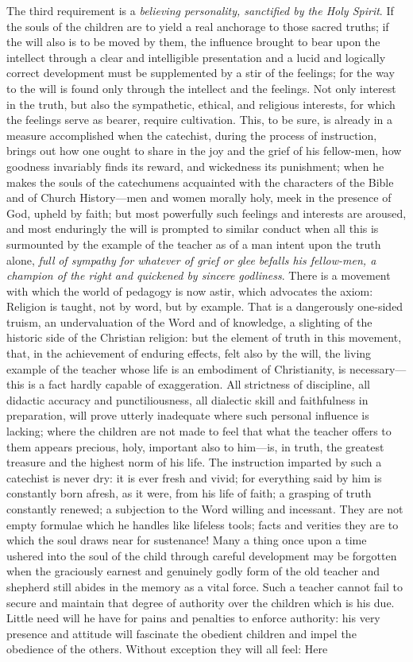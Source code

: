 The third requirement is a \emph{believing personality, sanctified by the Holy Spirit}. If the souls of the children are to yield a real anchorage to those sacred truths; if the will also is to be moved by them, the influence brought to bear upon the intellect through a clear and intelligible presentation and a lucid and logically correct development must be supplemented by a stir of the feelings; for the way to the will is found only through the intellect and the feelings. Not only interest in the truth, but also the sympathetic, ethical, and religious interests, for which the feelings serve as bearer, require cultivation. This, to be sure, is already in a measure accomplished when the catechist, during the process of instruction, brings out how one ought to share in the joy and the grief of his fellow-men, how goodness invariably finds its reward, and wickedness its punishment; when he makes the souls of the catechumens acquainted with the characters of the Bible and of Church History—men and women morally holy, meek in the presence of God, upheld by faith; but most powerfully such feelings and interests are aroused, and most enduringly the will is prompted to similar conduct when all this is surmounted by the example of the teacher as of a man intent upon the truth alone, \emph{full}
\emph{of sympathy for whatever of grief or glee befalls his fellow-men, a champion of the right and quickened by sincere godliness}. There is a movement with which the world of pedagogy is now astir, which advocates the axiom: Religion is taught, not by word, but by example. That is a dangerously one-sided truism, an undervaluation of the Word and of knowledge, a slighting of the historic side of the Christian religion: but the element of truth in this movement, that, in the achievement of enduring effects, felt also by the will, the living example of the teacher whose life is an embodiment of Christianity, is necessary—this is a fact hardly capable of exaggeration. All strictness of discipline, all didactic accuracy and punctiliousness, all dialectic skill and faithfulness in preparation, will prove utterly inadequate where such personal influence is lacking; where the children are not made to feel that what the teacher offers to them appears precious, holy, important also to him—is, in truth, the greatest treasure and the highest norm of his life. The instruction imparted by such a catechist is never dry: it is ever fresh and vivid; for everything said by him is constantly born afresh, as it were, from his life of faith; a grasping of truth constantly renewed; a subjection to the Word willing and incessant. They are not empty formulae which he handles like lifeless tools; facts and verities they are to which the soul draws near for sustenance! Many a thing once upon a time ushered into the soul of the child through careful development may be forgotten when the graciously earnest and genuinely godly form of the old teacher and shepherd still abides in the memory as a vital force. Such a teacher cannot fail to secure and maintain that degree of authority over the children which is his due. Little need will he have for pains and penalties to enforce authority: his very presence and attitude will fascinate the obedient children and impel the obedience of the others. Without exception they will all feel: Here
